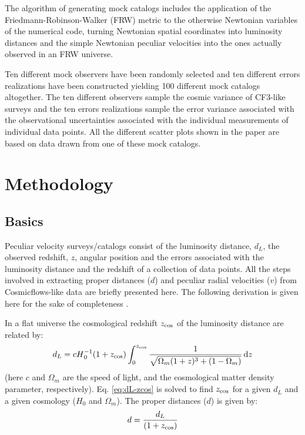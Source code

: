 \documentclass[useAMS,usenatbib]{mn2e}
\renewcommand{\d}[1]{\ensuremath{\operatorname{d}\!{#1}}}
\def\zcos{ z_{\rm cos} }
\begin{document}
The algorithm of generating mock catalogs includes the  application of the Friedmann-Robinson-Walker (FRW) metric to the otherwise Newtonian variables of the numerical code, turning Newtonian spatial coordinates into luminosity distances and  the simple Newtonian peculiar velocities into the ones actually observed in an FRW universe. 


Ten different mock observers have been randomly selected  and ten different errors realizations have been constructed yielding 100 different mock catalogs altogether. The  ten different observers sample the cosmic variance of CF3-like surveys and the ten errors realizations sample the error variance associated with the observational uncertainties associated with the individual measurements of individual data points.
All the different scatter plots shown in the paper are based on data drawn from one of these mock catalogs. 

\section{Methodology}
\label{sec:method}

\subsection{Basics}

Peculiar velocity surveys/catalogs consist of  the luminosity distance, $d_L$,  the observed redshift, $z$, angular position and the errors associated with the luminosity distance  and the redshift of a collection of  data points. 
All the steps involved in extracting proper distances ($d$) and peculiar radial  velocities ($v$) from Cosmicflows-like data are briefly presented here. 
The following derivation  is given here for the sake of completeness  
\citep[see][]{2008cosm.book.....W,2014MNRAS.442.1117D}.

In a flat  universe the cosmological redshift $z_{\rm cos}$ of the luminosity distance  are related by:
\begin{equation}
d_L=c H{^{-1}_0}(1+\zcos)  \int_0^{\zcos}{1\over\sqrt{\Omega_m(1+z)^3+(1-\Omega_m)}}\d{z}
\label{eq:dL-zcos}
\end{equation}
(here $c $ and $\Omega_m$ are the speed of light, and the cosmological matter density parameter, respectively). Eq. \ref{eq:dL-zcos}  is solved to find $z_{\rm cos}$ for a given $d_L$ and a given cosmology ($H_0$ and $\Omega_m$). The proper  distances ($d$)  is given by:
\begin{equation}
d={d_L\over (1 + \zcos) }
\label{eq:d-dL}
\end{equation}
\end{document}
